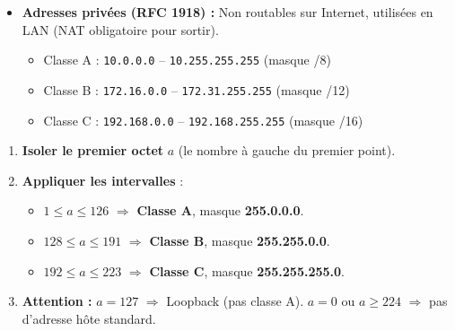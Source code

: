 \documentclass[11pt]{article}
\begin{document}
\begin{propriete}
\begin{itemize}
\item \textbf{Adresses privées (RFC 1918) :} Non routables sur Internet, utilisées en LAN (NAT obligatoire pour sortir).
  \begin{itemize}
  \item Classe A : \texttt{10.0.0.0} -- \texttt{10.255.255.255} (masque /8)
  \item Classe B : \texttt{172.16.0.0} -- \texttt{172.31.255.255} (masque /12)
  \item Classe C : \texttt{192.168.0.0} -- \texttt{192.168.255.255} (masque /16)
  \end{itemize}
\end{itemize}
\end{propriete}

\begin{methode}
\begin{enumerate}
\item \textbf{Isoler le premier octet} $a$ (le nombre à gauche du premier point).
\item \textbf{Appliquer les intervalles} :
  \begin{itemize}
  \item $1 \le a \le 126$ $\Rightarrow$ \textbf{Classe A}, masque \textbf{255.0.0.0}.
  \item $128 \le a \le 191$ $\Rightarrow$ \textbf{Classe B}, masque \textbf{255.255.0.0}.
  \item $192 \le a \le 223$ $\Rightarrow$ \textbf{Classe C}, masque \textbf{255.255.255.0}.
  \end{itemize}
\item \textbf{Attention :} $a = 127$ $\Rightarrow$ Loopback (pas classe A). $a = 0$ ou $a \ge 224$ $\Rightarrow$ pas d'adresse hôte standard.
\end{enumerate}
\end{methode}
\end{document}

